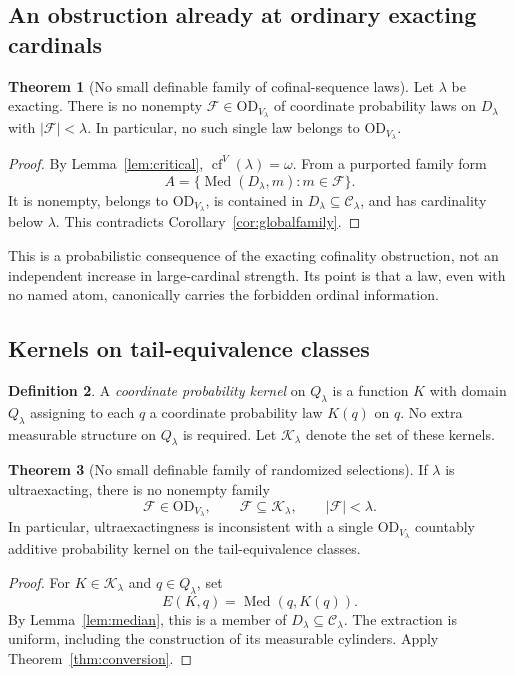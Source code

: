\documentclass[11pt,letterpaper]{article}
\theoremstyle{definition}
\newtheorem{definition}{Definition}[section]
\newtheorem{theorem}[definition]{Theorem}
\numberwithin{equation}{section}
\newcommand{\OD}{\mathrm{OD}}
\newcommand{\cf}{\operatorname{cf}}
\newcommand{\D}{D_\lambda}
\newcommand{\Q}{Q_\lambda}
\newcommand{\C}{\mathcal C_\lambda}
\newcommand{\FF}{\mathcal F}
\newcommand{\Med}{\operatorname{Med}}
\newcommand{\Ker}{\mathcal K_\lambda}
\begin{document}
\subsection{An obstruction already at ordinary exacting cardinals}

\begin{theorem}[No small definable family of cofinal-sequence laws]\label{thm:globallaws}
Let $\lambda$ be exacting. There is no nonempty $\FF\in\OD_{V_\lambda}$ of coordinate probability laws on $\D$ with $|\FF|<\lambda$. In particular, no such single law belongs to $\OD_{V_\lambda}$.
\end{theorem}
\begin{proof}
By Lemma~\ref{lem:critical}, $\cf^V(\lambda)=\omega$. From a purported family form
\[
 A=\{\Med(\D,m):m\in\FF\}.
\]
It is nonempty, belongs to $\OD_{V_\lambda}$, is contained in $\D\subseteq\C$, and has cardinality below $\lambda$. This contradicts Corollary~\ref{cor:globalfamily}.
\end{proof}

This is a probabilistic consequence of the exacting cofinality obstruction, not an independent increase in large-cardinal strength. Its point is that a law, even with no named atom, canonically carries the forbidden ordinal information.

\subsection{Kernels on tail-equivalence classes}

\begin{definition}
A \emph{coordinate probability kernel} on $\Q$ is a function $K$ with domain $\Q$ assigning to each $q$ a coordinate probability law $K(q)$ on $q$. No extra measurable structure on $\Q$ is required. Let $\Ker$ denote the set of these kernels.
\end{definition}

\begin{theorem}[No small definable family of randomized selections]\label{thm:kernels}
If $\lambda$ is ultraexacting, there is no nonempty family
\[
 \FF\in\OD_{V_\lambda},\qquad
 \FF\subseteq\Ker,\qquad |\FF|<\lambda.
\]
In particular, ultraexactingness is inconsistent with a single $\OD_{V_\lambda}$ countably additive probability kernel on the tail-equivalence classes.
\end{theorem}
\begin{proof}
For $K\in\Ker$ and $q\in\Q$, set
\[
 E(K,q)=\Med(q,K(q)).
\]
By Lemma~\ref{lem:median}, this is a member of $\D\subseteq\C$. The extraction is uniform, including the construction of its measurable cylinders. Apply Theorem~\ref{thm:conversion}.
\end{proof}
\end{document}
